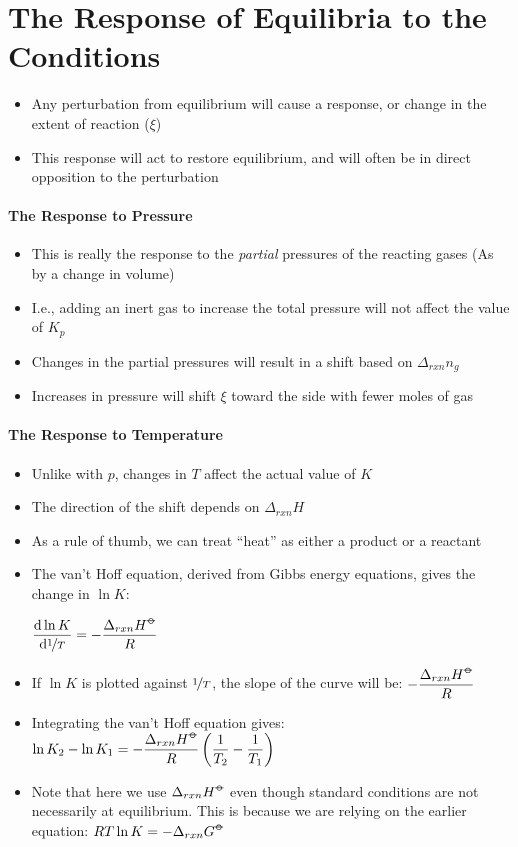 \documentclass[12pt, openany, letterpaper]{memoir}
\begin{document}
\section{The Response of Equilibria to the Conditions}
\begin{itemize}
	\item Any perturbation from equilibrium will cause a response, or change in the extent of reaction ($\xi$)
	\item This response will act to restore equilibrium, and will often be in direct opposition to the perturbation
\end{itemize}
\paragraph{The Response to Pressure}
\begin{itemize}
	\item This is really the response to the \emph{partial} pressures of the reacting gases (As by a change in volume)
	\item I.e., adding an inert gas to increase the total pressure will not affect the value of $K_{p}$
	\item Changes in the partial pressures will result in a shift based on $\Delta_{rxn}n_{g}$
	\item Increases in pressure will shift $\xi$ toward the side with fewer moles of gas
\end{itemize}
\paragraph{The Response to Temperature}
\begin{itemize}
	\item Unlike with $p$, changes in $T$ affect the actual value of $K$
	\item The direction of the shift depends on $\Delta_{rxn}H$
	\item As a rule of thumb, we can treat “heat” as either a product or a reactant
	\item The van't Hoff equation, derived from Gibbs energy equations, gives the change in $\ln K$:

	      $\dfrac{\mathrm{d}\ln K}{\mathrm{d}\nicefrac{1}{T}} = -\dfrac{\Delta_{rxn}H^{\std}}{R}$
	\item If $\ln K$ is plotted against $\nicefrac{1}{T}$, the slope of the curve will be: $-\dfrac{\Delta_{rxn}H^{\std}}{R}$
	\item Integrating the van't Hoff equation gives: $\ln K_2 - \ln K_1 = -\dfrac{\Delta_{rxn}H^{\std}}{R}\left(\dfrac{1}{T_2}-\dfrac{1}{T_1}\right)$
	\item Note that here we use $\Delta_{rxn}H^{\std}$ even though standard conditions are not necessarily at equilibrium. This is because we are relying on the earlier equation: $RT\ln K = -\Delta_{rxn}G^{\std}$
\end{itemize}
\end{document}
